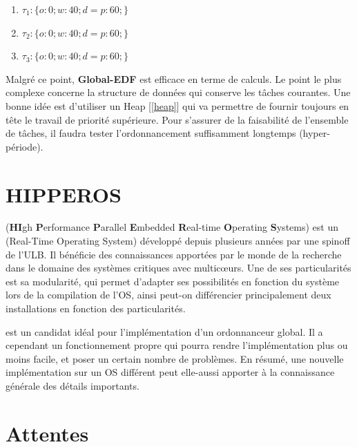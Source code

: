 	\begin{enumerate}
		\setlength\itemsep{0.1em}
		\item $\tau_1 : \{o:0; w:40; d=p:60;\}$
		\item $\tau_2 : \{o:0; w:40; d=p:60;\}$
		\item $\tau_3 : \{o:0; w:40; d=p:60;\}$
	\end{enumerate}
	
	
	Malgré ce point, \textbf{Global-EDF} est \og{}efficace\fg{} en terme de calculs.
	Le point le plus complexe concerne la structure de données qui conserve les 
	tâches courantes. Une bonne idée est d'utiliser un Heap [\ref*{heap}] qui 
	va permettre de fournir toujours en tête le travail de priorité supérieure.
	Pour s'assurer de la faisabilité de l'ensemble de tâches, 
	il faudra tester l'ordonnancement suffisamment longtemps (hyper-période).\newline

		
\section{HIPPEROS}
	 (\textbf{HI}gh \textbf{P}erformance \textbf{P}arallel \textbf{E}mbedded \textbf{R}eal-time \textbf{O}perating \textbf{S}ystems)
	est un  (Real-Time Operating System) développé depuis plusieurs années par une spinoff de l'ULB.
	Il bénéficie des connaissances apportées par le monde de la recherche dans 
	le domaine des systèmes critiques avec multic\oe{}urs. Une de ses particularités 
	est sa modularité, qui permet d'adapter ses possibilités en fonction du système 
	lors de la compilation de l'OS, ainsi peut-on différencier principalement 
	deux installations en fonction des particularités. 
	
	 est un candidat idéal pour l'implémentation d'un ordonnanceur 
	global. Il a cependant un fonctionnement propre qui pourra rendre l'implémentation 
	plus ou moins facile, et poser un certain nombre de problèmes. 
	En résumé, une nouvelle implémentation sur un OS différent 
	peut elle-aussi apporter à la connaissance générale des détails importants.
		
\section{Attentes}

